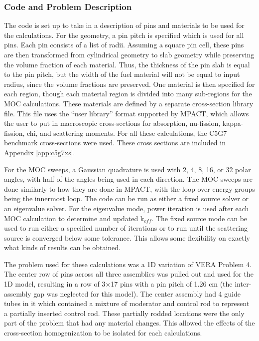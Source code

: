 \subsubsection{Code and Problem Description}

The code is set up to take in a description of pins and materials to be used for the calculations.  For the geometry, a pin pitch is specified which is used for all pins.  Each pin consists of a list of radii.  Assuming a square pin cell, these pins are then transformed from cylindrical geometry to slab geometry while preserving the volume fraction of each material.  Thus, the thickness of the pin slab is equal to the pin pitch, but the width of the fuel material will not be equal to input radius, since the volume fractions are preserved.  One material is then specified for each region, though each material region is divided into many sub-regions for the MOC calculations.  These materials are defined by a separate cross-section library file.  This file uses the ``user library'' format supported by MPACT, which allows the user to put in macroscopic cross-sections for absorption, nu-fission, kappa-fission, chi, and scattering moments.  For all these calculations, the C5G7 benchmark cross-sections \cite{EELewisC5G72003,EELewisC5G7extended2005} were used.  These cross sections are included in Appendix \ref{app:c5g7xs}.

For the MOC sweeps, a Gaussian quadrature \cite{HandbookOfMathFunctions1972} is used with 2, 4, 8, 16, or 32 polar angles, with half of the angles being used in each direction.  The MOC sweeps are done similarly to how they are done in MPACT, with the loop over energy groups being the innermost loop.  The code can be run as either a fixed source solver or an eigenvalue solver.  For the eigenvalue mode, power iteration is used after each MOC calculation to determine and updated k$_{eff}$.  The fixed source mode can be used to run either a specified number of iterations or to run until the scattering source is converged below some tolerance.  This allows some flexibility on exactly what kinds of results can be obtained.

The problem used for these calculations was a 1D variation of VERA Problem 4.  The center row of pins across all three assemblies was pulled out and used for the 1D model, resulting in a row of 3$\times$17 pins with a pin pitch of 1.26 cm (the inter-assembly gap was neglected for this model).  The center assembly had 4 guide tubes in it which contained a mixture of moderator and control rod to represent a partially inserted control rod.  These partially rodded locations were the only part of the problem that had any material changes.  This allowed the effects of the cross-section homogenization to be isolated for each calculations.

